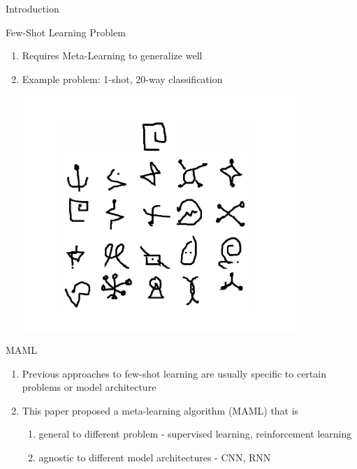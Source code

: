 \documentclass[compress]{beamer}
\begin{document}
\begin{frame}[allowframebreaks]{Introduction}
    \begin{block}{Few-Shot Learning Problem}
        \begin{enumerate}
            \item Requires Meta-Learning to generalize well
            \item Example problem: 1-shot, 20-way classification
                \begin{centering}
                    \includegraphics[height=.5\textheight]{oneshotnway}
                \end{centering}
        \end{enumerate}
    \end{block}
    \begin{block}{MAML}
        \begin{enumerate}
            \item Previous approaches to few-shot learning are usually specific to certain problems or model architecture
            \item This paper proposed a meta-learning algorithm (MAML) that is
                \begin{enumerate}
                    \item general to different problem - supervised learning, reinforcement learning
                    \item agnostic to different model architectures - CNN, RNN
                \end{enumerate}
        \end{enumerate}
    \end{block}

\end{frame}
\end{document}
